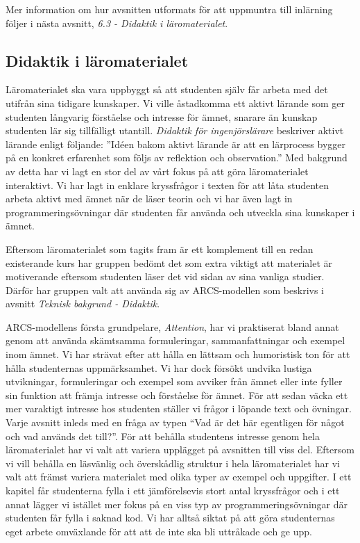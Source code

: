 \documentclass[]{article}
\begin{document}
Mer information om hur avsnitten utformats för att uppmuntra till
inlärning följer i nästa avsnitt, \textit{6.3 - Didaktik i läromaterialet}.

\subsection{Didaktik i läromaterialet}
Läromaterialet ska vara uppbyggt så att studenten själv får arbeta med
det utifrån sina tidigare kunskaper. Vi ville åstadkomma ett aktivt
lärande som ger studenten långvarig förståelse och intresse för ämnet,
snarare än kunskap studenten lär sig tillfälligt
utantill. \textit{Didaktik för ingenjörslärare}\cite{didaktik_for_ingenjorslarare} beskriver aktivt
lärande enligt följande: ”Idéen bakom aktivt lärande är att en
lärprocess bygger på en konkret erfarenhet som följs av reflektion och
observation.” Med bakgrund av detta har vi lagt en stor del av vårt
fokus på att göra läromaterialet interaktivt. Vi har lagt in enklare
kryssfrågor i texten för att låta studenten arbeta aktivt med ämnet
när de läser teorin och vi har även lagt in programmeringsövningar där
studenten får använda och utveckla sina kunskaper i ämnet.

Eftersom läromaterialet som tagits fram är ett komplement till en
redan existerande kurs har gruppen bedömt det som extra viktigt att
materialet är motiverande eftersom studenten läser det vid sidan av
sina vanliga studier. Därför har gruppen valt att använda sig av
ARCS-modellen som beskrivs i avsnitt \textit{Teknisk bakgrund -
 Didaktik}.

ARCS-modellens första grundpelare, \textit{Attention}, har vi
praktiserat bland annat genom att använda skämtsamma formuleringar,
sammanfattningar och exempel inom ämnet. Vi har strävat efter att
hålla en lättsam och humoristisk ton för att hålla studenternas
uppmärksamhet. Vi har dock försökt undvika lustiga utvikningar,
formuleringar och exempel som avviker från ämnet eller inte fyller sin
funktion att främja intresse och förståelse för ämnet. För att sedan
väcka ett mer varaktigt intresse hos studenten ställer vi frågor i
löpande text och övningar. Varje avsnitt inleds med en fråga av typen
“Vad är det här egentligen för något och vad används det till?”. För
att behålla studentens intresse genom hela läromaterialet har vi valt
att variera upplägget på avsnitten till viss del. Eftersom vi vill
behålla en läsvänlig och överskådlig struktur i hela läromaterialet
har vi valt att främst variera materialet med olika typer av exempel
och uppgifter. I ett kapitel får studenterna fylla i ett jämförelsevis
stort antal kryssfrågor och i ett annat lägger vi istället mer fokus på en
viss typ av programmeringsövningar där studenten får fylla i saknad
kod. Vi har alltså siktat på att göra studenternas eget arbete
omväxlande för att att de inte ska bli uttråkade och ge upp.
\end{document}
